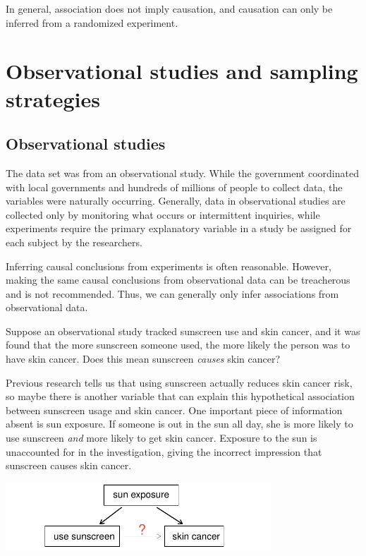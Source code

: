 \begin{tipBox}{
In general, association does not imply causation, and causation can only be inferred from a randomized experiment.}
\end{tipBox}


\section{Observational studies and sampling strategies}

\subsection{Observational studies}

The  data set was from an observational study. While the government coordinated with local governments and hundreds of millions of people to collect data, the variables were naturally occurring. Generally, data in observational studies are collected only by monitoring what occurs or intermittent inquiries, while experiments require the primary explanatory variable in a study be assigned for each subject by the researchers.

Inferring causal conclusions from experiments is often reasonable. However, making the same causal conclusions from observational data can be treacherous and is not recommended. Thus, we can generally only infer associations from observational data.

\begin{exercise} \label{sunscreenLurkingExample}
Suppose an observational study tracked sunscreen use and skin cancer, and it was found that the more sunscreen someone used, the more likely the person was to have skin cancer. Does this mean sunscreen \emph{causes} skin cancer?
\end{exercise}

Previous research tells us that using sunscreen actually reduces skin cancer risk, so maybe there is another variable that can explain this hypothetical association between sunscreen usage and skin cancer. One important piece of information absent is sun exposure. If someone is out in the sun all day, she is more likely to use sunscreen \emph{and} more likely to get skin cancer. Exposure to the sun is unaccounted for in the investigation, giving the incorrect impression that sunscreen causes skin cancer.
\begin{center}
\includegraphics[height=1.0in]{01/figures/variables/sunCausesCancer}
\end{center}

